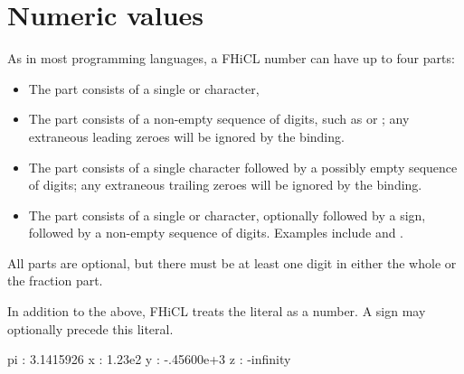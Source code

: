 \documentclass[draftmode,draftwater]{memarticle}
\newcommand{\fhicl}%
 {FHiCL\xspace}
\begin{document}
\section{Numeric values}
%

As in most programming languages,
a \fhicl number
can have up to four parts:
\begin{itemize}
  \item The  part consists of
        a single \fclcode{+} or \fclcode{-} character,
  \item The  part consists of
        a non-empty sequence of digits,
        such as  or ;
        any extraneous leading zeroes
        will be ignored by the binding.
  \item The  part consists of
        a single  character
        followed by
        a possibly empty sequence of digits;
        any extraneous trailing zeroes
        will be ignored by the binding.
  \item The  part consists of
        a single  or  character,
        optionally followed by a sign,
        followed by
        a non-empty sequence of digits.
        Examples include  and .
\end{itemize}
All parts are optional,
but there must be
at least one digit
in either the whole or the fraction part.

In addition to the above,
\fhicl treats the literal 
as a number.
A sign
may optionally precede this literal.
%
%
\Needspace{0.67in}
\begin{fcllisting}[texcl,escapechar=`]
pi : 3.1415926
x  : 1.23e2
y  : -.45600e+3
z  : -infinity
\end{fcllisting}
\end{document}

